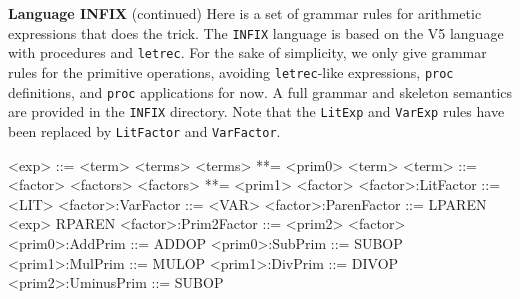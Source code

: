\begin{minipage}[t]{\sw}
\slidenumber
\LARGE
{\bf Language INFIX} (continued)\exx
Here is a set of grammar rules
for arithmetic expressions that does the trick.
The \verb'INFIX' language is based on the V5 language with procedures
and \verb'letrec'.
For the sake of simplicity, we only give grammar rules
for the primitive operations,
avoiding \verb'letrec'-like expressions, \verb'proc' definitions,
and \verb'proc' applications for now.
A full grammar and skeleton semantics are provided
in the \verb'INFIX' directory.
Note that the \verb'LitExp' and \verb'VarExp' rules
have been replaced by \verb'LitFactor' and \verb'VarFactor'.
\begin{qv}
<exp>                ::= <term> <terms>
<terms>              **= <prim0> <term>
<term>               ::= <factor> <factors>
<factors>            **= <prim1> <factor>
<factor>:LitFactor   ::= <LIT>
<factor>:VarFactor   ::= <VAR>
<factor>:ParenFactor ::= LPAREN <exp> RPAREN
<factor>:Prim2Factor ::= <prim2> <factor>
<prim0>:AddPrim      ::= ADDOP
<prim0>:SubPrim      ::= SUBOP
<prim1>:MulPrim      ::= MULOP
<prim1>:DivPrim      ::= DIVOP
<prim2>:UminusPrim   ::= SUBOP
\end{qv}
\end{minipage}
